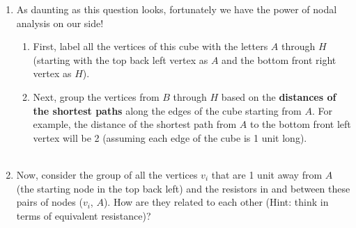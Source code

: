 \begin{enumerate}
    \item As daunting as this question looks, fortunately we have the power of nodal analysis on our side! 
    \begin{enumerate}
        \item First, label all the vertices of this cube with the letters $A$ through $H$ (starting with the top back left vertex as $A$ and the bottom front right vertex as $H$). \\
        \item Next, group the vertices from $B$ through $H$ based on the \textbf{distances of the shortest paths} along the edges of the cube starting from $A$. For example, the distance of the shortest path from $A$ to the bottom front left vertex will be 2 (assuming each edge of the cube is 1 unit long). \\
         \\
    \end{enumerate}  
    \item Now, consider the group of all the vertices $v_i$ that are 1 unit away from $A$ (the starting node in the top back left) and the resistors in and between these pairs of nodes ($v_i$, $A$). How are they related to each other (Hint: think in terms of equivalent resistance)? \\

\end{enumerate}
